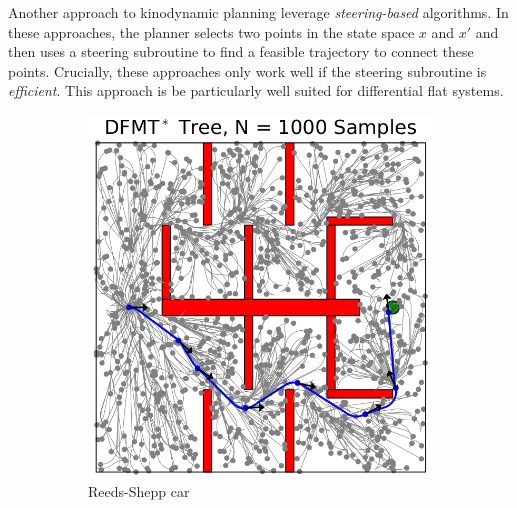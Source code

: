 Another approach to kinodynamic planning leverage \textit{steering-based} algorithms. In these approaches, the planner selects two points in the state space $x$ and $x'$ and then uses a steering subroutine to find a feasible trajectory to connect these points. Crucially, these approaches only work well if the steering subroutine is \textit{efficient}. This approach is be particularly well suited for differential flat systems.

\begin{figure}[ht]
    \centering
    \begin{subfigure}[b]{0.4\linewidth}
      \includegraphics[width=\linewidth]{tex/figs/ch06_figs/driftless.png}
      \caption{Reeds-Shepp car}
    \end{subfigure}
    \begin{subfigure}[b]{0.4\linewidth}

\end{subfigure}
\end{figure}
